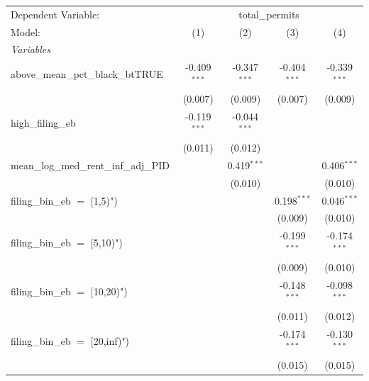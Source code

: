 \begingroup
\centering
\begin{tabular}{lcccc}
   \tabularnewline \midrule \midrule
   Dependent Variable: & \multicolumn{4}{c}{total\_permits}\\
   Model:                                    & (1)            & (2)            & (3)            & (4)\\  
   \midrule
   \emph{Variables}\\
   above\_mean\_pct\_black\_btTRUE           & -0.409$^{***}$ & -0.347$^{***}$ & -0.404$^{***}$ & -0.339$^{***}$\\   
                                             & (0.007)        & (0.009)        & (0.007)        & (0.009)\\   
   high\_filing\_eb                          & -0.119$^{***}$ & -0.044$^{***}$ &                &   \\   
                                             & (0.011)        & (0.012)        &                &   \\   
   mean\_log\_med\_rent\_inf\_adj\_PID       &                & 0.419$^{***}$  &                & 0.406$^{***}$\\   
                                             &                & (0.010)        &                & (0.010)\\   
   filing\_bin\_eb $=$ [1,5)")               &                &                & 0.198$^{***}$  & 0.046$^{***}$\\   
                                             &                &                & (0.009)        & (0.010)\\   
   filing\_bin\_eb $=$ [5,10)")              &                &                & -0.199$^{***}$ & -0.174$^{***}$\\   
                                             &                &                & (0.009)        & (0.010)\\   
   filing\_bin\_eb $=$ [10,20)")             &                &                & -0.148$^{***}$ & -0.098$^{***}$\\   
                                             &                &                & (0.011)        & (0.012)\\   
   filing\_bin\_eb $=$ [20,inf)")            &                &                & -0.174$^{***}$ & -0.130$^{***}$\\   
                                             &                &                & (0.015)        & (0.015)\\   
   \midrule

\end{tabular}
